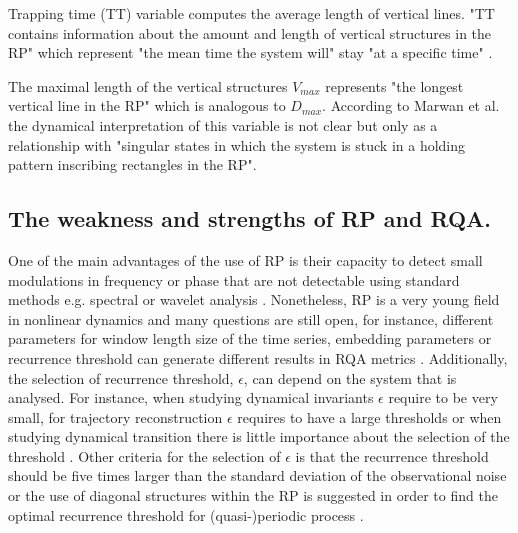 Trapping time (TT) variable computes the average length of vertical lines. 
"TT contains information about the amount and length of vertical 
structures in the RP" which represent "the mean time the system will" 
stay "at a specific time" \citep[p. 17]{marwan2015}.

The maximal length of the vertical structures $V_{max}$ represents 
"the longest vertical line in the RP" which is analogous to $D_{max}$. 
According to Marwan et al. \cite[p. 17]{marwan2015} the dynamical 
interpretation of this variable is not clear but only as a relationship 
with "singular states in which the system is stuck in a holding pattern
inscribing rectangles in the RP".
%
 
 
\subsection{The weakness and strengths of RP and RQA.} \label{sec:ws_rqa}
One of the main advantages of the use of RP is their capacity to detect 
small modulations in frequency or phase that are not detectable using standard 
methods e.g. spectral or wavelet analysis \citep{marwan2011}.
Nonetheless, RP is a very young field in nonlinear dynamics
and many questions are still open, for instance, 
different parameters for window length size of the time series,
embedding parameters or recurrence threshold can generate different 
results in RQA metrics \citep{marwan2011, eckmann1987}.
Additionally, the selection of recurrence threshold, $\epsilon$, 
can depend on the system that is analysed. For instance, when studying 
dynamical invariants $\epsilon$ require to be very small, for trajectory 
reconstruction $\epsilon$ requires to have a large thresholds or 
when studying dynamical transition there is little importance about the 
selection of the threshold \citep{marwan2011}. Other criteria for the 
selection of $\epsilon$ is that the recurrence threshold should be five 
times larger than the standard deviation of the observational noise
or the use of diagonal structures within the RP is suggested in order
to find the optimal recurrence threshold for (quasi-)periodic process 
\citep{marwan2011}.



